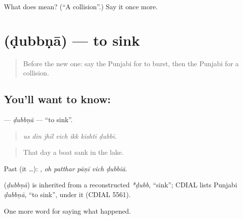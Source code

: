 \begin{tcolorbox}[breakable,colback=teal!4,colframe=teal!35!black,title={Before you move on}]
What does  mean? (\textquotedblleft{}A collision\textquotedblright{}.) Say it once more.
\end{tcolorbox}
\section[\texorpdfstring{\pa{ਡੁੱਬਣਾ} (ḍubbṇā)}{ਡੁੱਬਣਾ (ḍubbṇā)}]{ (ḍubbṇā) — to sink}

\label{lesson:PA-C318-dubbna}



\begin{quote}
Before the new one: say the Punjabi for to burst, then the Punjabi for a collision.
\end{quote}

\subsection*{You'll want to know: }
\textbf{} — \emph{ḍubbṇā} — \textquotedblleft{}to sink\textquotedblright{}.

\begin{quote}
      
\end{quote}

\begin{quote}
\emph{us din jhīl vich ikk kishtī ḍubbī.}
\end{quote}

\begin{quote}
That day a boat sank in the lake.
\end{quote}

Past (it …):     , \emph{oh patthar pāṇī vich ḍubbiā}.

\begin{cousinweb}
\textbf{} (\emph{ḍubbṇā}) is inherited from a reconstructed \emph{*ḍubb}, \textquotedblleft{}sink\textquotedblright{}; CDIAL lists Punjabi \emph{ḍubbṇā}, \textquotedblleft{}to sink\textquotedblright{}, under it (CDIAL 5561).
\end{cousinweb}

\begin{grammarlens}[title={What you've built}]
One more word for saying what happened.
\end{grammarlens}

